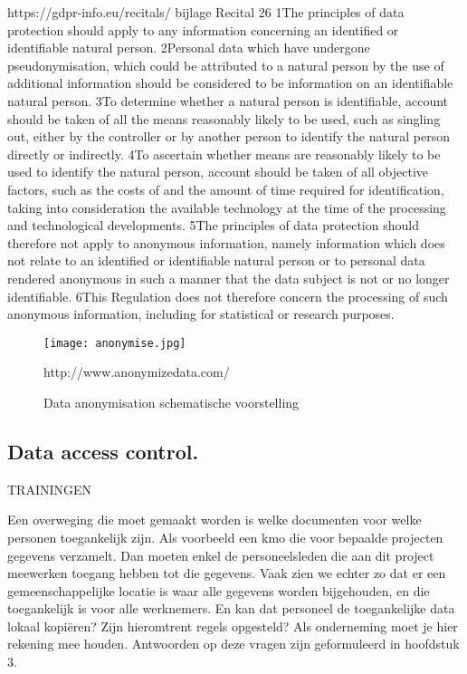 https://gdpr-info.eu/recitals/ bijlage
Recital 26
1The principles of data protection should apply to any information concerning an identified or identifiable natural person. 2Personal data which have undergone pseudonymisation, which could be attributed to a natural person by the use of additional information should be considered to be information on an identifiable natural person. 3To determine whether a natural person is identifiable, account should be taken of all the means reasonably likely to be used, such as singling out, either by the controller or by another person to identify the natural person directly or indirectly. 4To ascertain whether means are reasonably likely to be used to identify the natural person, account should be taken of all objective factors, such as the costs of and the amount of time required for identification, taking into consideration the available technology at the time of the processing and technological developments. 5The principles of data protection should therefore not apply to anonymous information, namely information which does not relate to an identified or identifiable natural person or to personal data rendered anonymous in such a manner that the data subject is not or no longer identifiable. 6This Regulation does not therefore concern the processing of such anonymous information, including for statistical or research purposes.

\begin{figure}[h]
	\texttt{[image: anonymise.jpg]}
	\caption{Data anonymisation schematische voorstelling}
	http://www.anonymizedata.com/
\end{figure}


\subsection{Data access control.}
TRAININGEN 

Een overweging die moet gemaakt worden is welke documenten voor welke personen toegankelijk zijn. Als voorbeeld een kmo die voor bepaalde projecten gegevens verzamelt. Dan moeten enkel de personeelsleden die aan dit project meewerken toegang hebben tot die gegevens.  Vaak zien we echter zo dat er een gemeenschappelijke locatie is waar alle gegevens worden bijgehouden, en die toegankelijk is voor alle werknemers. 
En kan dat personeel de toegankelijke data lokaal kopiëren? Zijn hieromtrent regels opgesteld? Als onderneming moet je hier rekening mee houden. Antwoorden op deze vragen zijn geformuleerd in hoofdstuk 3. 

